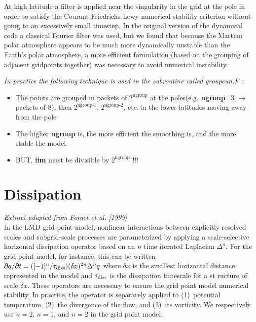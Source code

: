 At high latitude a filter is applied near
the singularity in the grid at the pole
in order to satisfy the Courant-Friedrichs-Lewy numerical
stability criterion without going to an excessively
small timestep. In the original version of the dynamical code
a classical Fourier filter was used,  but
we found that because the Martian polar
atmosphere appears to be much more dynamically unstable than the Earth's
polar atmosphere, a more efficient formulation (based on the
grouping of adjacent gridpoints together)  was necessary
to avoid numerical instability. \\

{\it In practice the following technique is used in the subroutine called {\em groupeun.F} :
\begin{itemize}
\item The points are grouped in packets of $2^{\mbox{ngroup}}$
      at the poles(e.g. {\bf ngroup}=3 $\rightarrow$ packets of 8),
 then $2^{\mbox{ngroup-1}}$,
      $2^{\mbox{ngroup-2}}$, etc. in the lower latitudes moving away from the pole

   \item The higher {\bf ngroup} is, the more efficient the smoothing is, and the more stable the model.

\item   BUT, {\bf iim} must be divisible by $2^{\mbox{ngroup}}$ !!!


\end{itemize}

}


\section{Dissipation}

{\it Extract adapted from Forget et al. [1999]}\\

In the LMD grid point model,
nonlinear interactions between explicitly resolved scales
and subgrid-scale processes are
parameterized by applying a scale-selective horizontal
dissipation operator
based on an $n$ time iterated Laplacian $\Delta^{n}$.
For the grid point model, for instance, this can be written
${\partial q}/{\partial t} = ([-1]^{n}/ {\tau_{\mbox{\scriptsize
diss}}})
(\delta x)^{2n} \Delta^{n} q$
where $\delta x$ is the smallest horizontal distance represented in the
model and $\tau_{\mbox{\scriptsize diss}}$ is the dissipation timescale
for a st
ructure of scale
$\delta x$.
These operators are necessary to ensure the grid point model
numerical stability.
In practice, the operator is
separately applied to (1)~potential temperature, (2)~the divergence of
the flow,
and (3)~its vorticity.
We respectively use  $n=2$, $n=1$, and $n=2$ in the grid point model.\\

